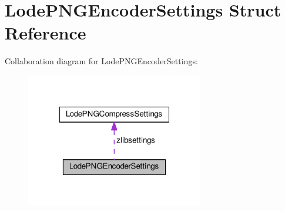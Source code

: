 \hypertarget{struct_lode_p_n_g_encoder_settings}{}\section{Lode\+P\+N\+G\+Encoder\+Settings Struct Reference}
\label{struct_lode_p_n_g_encoder_settings}


Collaboration diagram for Lode\+P\+N\+G\+Encoder\+Settings\+:
\nopagebreak
\begin{figure}[H]
\begin{center}
\leavevmode
\includegraphics[width=220pt]{struct_lode_p_n_g_encoder_settings__coll__graph}
\end{center}
\end{figure}
